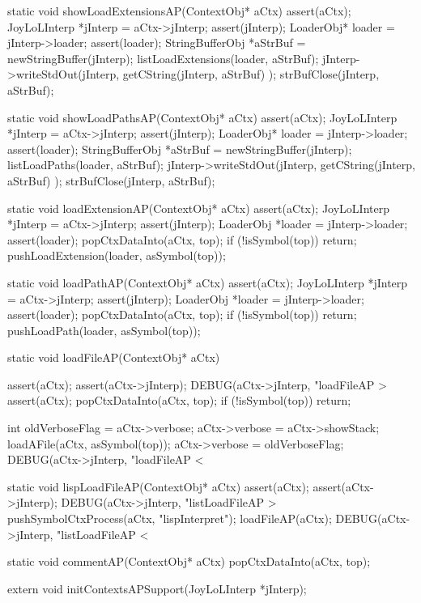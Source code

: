 \startCCode
static void showLoadExtensionsAP(ContextObj* aCtx) {
  assert(aCtx);
  JoyLoLInterp *jInterp = aCtx->jInterp;
  assert(jInterp);
  LoaderObj* loader = jInterp->loader;
  assert(loader);
  StringBufferObj *aStrBuf =
    newStringBuffer(jInterp);
  listLoadExtensions(loader, aStrBuf);
  jInterp->writeStdOut(jInterp,
    getCString(jInterp, aStrBuf)
  );
  strBufClose(jInterp, aStrBuf);
}
\stopCCode

\startCCode
static void showLoadPathsAP(ContextObj* aCtx) {
  assert(aCtx);
  JoyLoLInterp *jInterp = aCtx->jInterp;
  assert(jInterp);
  LoaderObj* loader = jInterp->loader;
  assert(loader);
  StringBufferObj *aStrBuf =
    newStringBuffer(jInterp);
  listLoadPaths(loader, aStrBuf);
  jInterp->writeStdOut(jInterp,
    getCString(jInterp, aStrBuf)
  );
  strBufClose(jInterp, aStrBuf);  
}
\stopCCode

\startCCode
static void loadExtensionAP(ContextObj* aCtx) {
  assert(aCtx);
  JoyLoLInterp *jInterp = aCtx->jInterp;
  assert(jInterp);
  LoaderObj *loader = jInterp->loader;
  assert(loader);
  popCtxDataInto(aCtx, top);
  if (!isSymbol(top)) return;
  pushLoadExtension(loader, asSymbol(top));
}
\stopCCode

\startCCode
static void loadPathAP(ContextObj* aCtx) {
  assert(aCtx);
  JoyLoLInterp *jInterp = aCtx->jInterp;
  assert(jInterp);
  LoaderObj *loader = jInterp->loader;
  assert(loader);
  popCtxDataInto(aCtx, top);
  if (!isSymbol(top)) return;
  pushLoadPath(loader, asSymbol(top));
}
\stopCCode

\startCCode
static void loadFileAP(ContextObj* aCtx) {
  assert(aCtx);
  assert(aCtx->jInterp);
  DEBUG(aCtx->jInterp, "loadFileAP > %
  assert(aCtx);
  popCtxDataInto(aCtx, top);
  if (!isSymbol(top)) return;
  
  int oldVerboseFlag = aCtx->verbose;
  aCtx->verbose = aCtx->showStack;
  loadAFile(aCtx, asSymbol(top));
  aCtx->verbose = oldVerboseFlag;
  DEBUG(aCtx->jInterp, "loadFileAP < %
}
\stopCCode

\startCCode
static void lispLoadFileAP(ContextObj* aCtx) {
  assert(aCtx);
  assert(aCtx->jInterp);
  DEBUG(aCtx->jInterp, "listLoadFileAP > %
  pushSymbolCtxProcess(aCtx, "lispInterpret");
  loadFileAP(aCtx);
  DEBUG(aCtx->jInterp, "listLoadFileAP < %
}
\stopCCode

\startCCode
static void commentAP(ContextObj* aCtx) {
  popCtxDataInto(aCtx, top);
}
\stopCCode

\startCHeader
extern void initContextsAPSupport(JoyLoLInterp *jInterp);
\stopCHeader
{}

